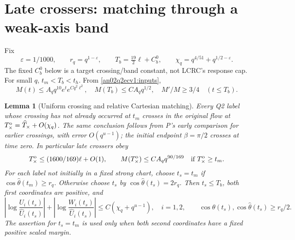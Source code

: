\documentclass[11pt]{article}
\newtheorem{lemma}[theorem]{Lemma}
\theoremstyle{remark}\newtheorem{remark}[theorem]{Remark}
\newcommand{\eps}{\varepsilon}
\begin{document}
\section{Late crossers: matching through a weak-axis band}
Fix
\[
 \eps=1/1000,\qquad r_q=q^{1-\eps},\qquad
 T_b=\tfrac{19}{2}\ell+C_b^0,\qquad
 \chi_q=q^{4/51}+q^{1/2-\eps}.
\]
The fixed $C_b^0$ below is a target crossing/band constant, not
LCRC's response cap. For small $q$, $t_m<T_b<t_h$.
From \eqref{an02q2ecv1:inputs},
\begin{equation}
 M(t)\le A_q q^{10}e^t e^{Cq^2\ell^2},\quad
 M(T_b)\le C A_q q^{1/2},\quad M'/M\ge3/4\quad(t\le T_b).
 \label{an02q2ecv1:earlymass}
\end{equation}

\begin{lemma}[Uniform crossing and relative Cartesian matching]
\label{an02q2ecv1:crossing}
Every Q2 label whose crossing has not already occurred at $t_m$
crosses in the original flow at
$T_\times^{\rm o}=\widehat T_\times+O(\chi_q)$.
The same conclusion follows from P's early comparison for earlier
crossings, with error $O(q^{u-1})$; the initial endpoint
$\beta=\pi/2$ crosses at time zero. In particular late crossers obey
\begin{equation}
 T_\times^{\rm o}\le(1600/169)\ell+O(1),\qquad
 M(T_\times^{\rm o})\le C A_q q^{90/169}
 \quad\hbox{if }T_\times^{\rm o}\ge t_m.
 \label{an02q2ecv1:latemass}
\end{equation}
For each label not initially in a fixed strong chart, choose
$t_s=t_m$ if $\cos\widehat\theta(t_m)\ge r_q$.
Otherwise choose $t_s$ by $\cos\widehat\theta(t_s)=2r_q$.
Then $t_s\le T_b$, both first coordinates are positive, and
\begin{equation}
 \left|\log\frac{U_i(t_s)}{\widehat U_i(t_s)}\right|
 +\left|\log\frac{W_i(t_s)}{\widehat U_i(t_s)}\right|
 \le C(\chi_q+q^{u-1}),\quad i=1,2,
 \qquad
 \cos\theta(t_s),\cos\widehat\theta(t_s)\ge r_q/2.
 \label{an02q2ecv1:match}
\end{equation}
The assertion for $t_s=t_m$ is used only when both second
coordinates have a fixed positive scaled margin.
\end{lemma}
\end{document}
